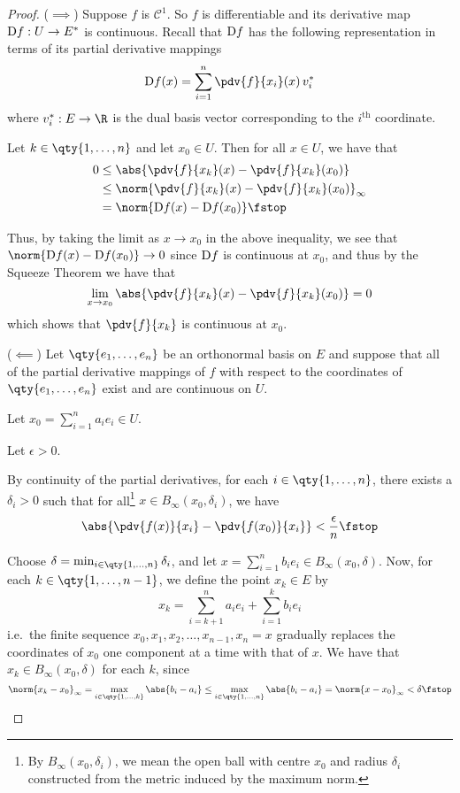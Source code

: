 \begin{proof}
  (\( \implies \)) Suppose \( f \) is \( \mathcal{C}^1 \). So \( f \) is differentiable and its derivative map \( \text{D} f:U\to E^* \) is continuous. Recall that \( \text{D} f \) has the following representation in terms of its partial derivative mappings
  \[ \D f(x)=\sum_{i=1}^n{\pdv{f}{x_i}}(x)\,v_i^* \]
  where \( v_i^*:E\to\R \) is the dual basis vector corresponding to the \( i^{\text{th}} \) coordinate.

  \vspace{3mm}

  Let \( k\in\qty{1,\dots,n} \) and let \( x_0\in U \). Then for all \( x\in U \), we have that
  \begin{align*}
   0&\leq\abs{{\pdv{f}{x_k}}(x)-{\pdv{f}{x_k}}(x_0)}\\
    &\leq \norm{{\pdv{f}{x_k}}(x)-{\pdv{f}{x_k}}(x_0)}_\infty\\
    &=\norm{\D f(x)-\D f(x_0)}\fstop
  \end{align*}

  Thus, by taking the limit as \( x\to x_0 \) in the above inequality, we see that \( \norm{\D f(x)-\D f(x_0)}\to 0 \) since \( \text{D} f \) is continuous at \( x_0 \), and thus by the Squeeze Theorem we have that
  \[ \lim_{x\to x_0}\abs{{\pdv{f}{x_k}}(x)-{\pdv{f}{x_k}}(x_0)}=0 \]
  which shows that \( \pdv{f}{x_k} \) is continuous at \( x_0 \).

  \vspace{3mm}

  (\( \impliedby \)) Let \( \qty{e_1,\dots,e_n} \) be an orthonormal basis on \( E \) and suppose that all of the partial derivative mappings of \( f \) with respect to the coordinates of \( \qty{e_1,\dots,e_n} \) exist and are continuous on \( U \).

  Let \( x_0=\sum_{i=1}^na_ie_i\in U \).

  Let \( \epsilon>0 \).

  By continuity of the partial derivatives, for each \( i\in\qty{1,\dots,n} \), there exists a \( \delta_i>0 \) such that for all\footnote{By \( B_\infty(x_0,\delta_i) \), we mean the open ball with centre \( x_0 \) and radius \( \delta_i \) constructed from the metric induced by the maximum norm.} \( x\in B_\infty(x_0,\delta_i) \), we have
  \[ \abs{\pdv{f(x)}{x_i}-\pdv{f(x_0)}{x_i}}<\frac{\epsilon}{n}\fstop \]

  Choose \( \delta=\min_{i\in\qty{1,\dots, n}}\delta_i \), and let \( x=\sum_{i=1}^nb_ie_i\in B_\infty(x_0,\delta) \). Now, for each \( k\in\qty{1,\dots,n-1} \), we define the point \( x_k\in E \) by
  \[ x_k=\sum_{i=k+1}^na_ie_i+\sum_{i=1}^kb_ie_i \]
  i.e.\ the finite sequence \( x_0,x_1,x_2,\dots,x_{n-1},x_n=x \) gradually replaces the coordinates of \( x_0 \) one component at a time with that of \( x \). We have that \( x_k\in B_\infty(x_0,\delta) \) for each \( k \), since
  \[ \norm{x_k-x_0}_\infty=\max_{i\in\qty{1,\dots,k}}\abs{b_i-a_i}\leq\max_{i\in\qty{1,\dots,n}}\abs{b_i-a_i}=\norm{x-x_0}_\infty<\delta\fstop \]


\end{proof}
